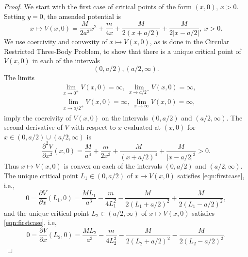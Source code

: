 \documentclass[12pt]{article}
\begin{document}
\begin{proof} We start with the first case of critical points of the form $(x,0)$, $x>0$. Setting $y=0$, the amended potential is
\[ x \mapsto V(x,0) = \frac{M}{2a^3}x^2 + \frac{m}{4 x } + \frac{M}{2(x + a/2)} + \frac{M}{2\vert x - a/2\vert},\ x>0.\]
We use coercivity and convexity of $x\mapsto V(x,0)$, as is done in the Circular Restricted Three-Body Problem, to show that there is a unique critical point of $V(x,0)$ in each of the intervals
\[ (0,a/2), (a/2,\infty).\]
The limits
\begin{align*}
& \lim_{x\to 0^+} V(x,0)  = \infty,\ 
\lim_{x\to {a/2}^-} V(x,0)  = \infty, \\
& \lim_{x\to {a/2}^+} V(x,0)  = \infty, \
\lim_{x\to\infty} V(x,0)  = \infty,
\end{align*}
imply the coercivity of $V(x,0)$ on the intervals $(0,a/2)$ and $(a/2,\infty)$.
The second derivative of $V$ with respect to $x$ evaluated at $(x,0)$ for $x\in (0,a/2) \cup (a/2,\infty)$ is
\begin{equation}\label{eqn:Vxx}
\frac{\partial^2 V}{\partial x^2}(x,0) = \frac{M}{a^3} + \frac{m}{2 x^3} + \frac{M}{(x+a/2)^3} + \frac{M}{\vert x-a/2\vert^3} > 0.
\end{equation}
Thus $x\mapsto V(x,0)$ is convex on each of the intervals $(0,a/2)$ and $(a/2,\infty)$. The unique critical point $L_1\in (0,a/2)$ of $x\mapsto V(x,0)$ satisfies \eqref{eqn:firstcase}, i.e.,
\begin{equation}\label{eqn:collinear1}
 0 = \frac{\partial V}{\partial x}(L_1,0) = \frac{M L_1}{a^3} - \frac{m}{4 L_1^2} - \frac{M}{2(L_1 + a/2)^2} + \frac{M}{2(L_1 - a/2)^2},
 \end{equation}
and the unique critical point $L_2\in (a/2,\infty)$ of $x\mapsto V(x,0)$ satisfies \eqref{eqn:firstcase}, i.e,
\begin{equation}\label{eqn:collinear2}
0 = \frac{\partial V}{\partial x}(L_2,0)  =  \frac{M L_2}{a^3} - \frac{m}{4 L_2^2} - \frac{M}{2(L_2 + a/2)^2} - \frac{M}{2(L_2 - a/2)^2}.
\end{equation}


\end{proof}
\end{document}
